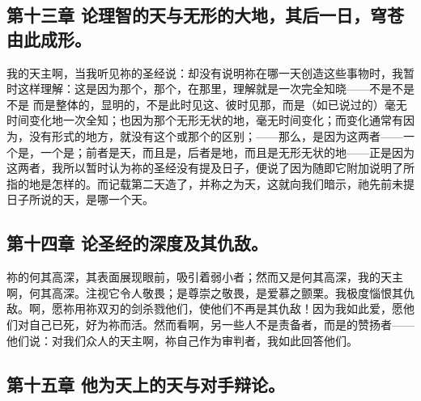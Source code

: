 \subsection{第十三章 论理智的天与无形的大地，其后一日，穹苍由此成形。}

我的天主啊，当我听见祢的圣经说：却没有说明祢在哪一天创造这些事物时，我暂时这样理解：这是因为那个，那个，在那里，理解就是一次完全知晓——不是不是不是 而是整体的，显明的，不是此时见这、彼时见那，而是（如已说过的）毫无时间变化地一次全知；也因为那个无形无状的地，毫无时间变化；而变化通常有因为，没有形式的地方，就没有这个或那个的区别；——那么，是因为这两者——一个是，一个是；前者是天，而且是，后者是地，而且是无形无状的地——正是因为这两者，我所以暂时认为祢的圣经没有提及日子，便说了因为随即它附加说明了所指的地是怎样的。而记载第二天造了，并称之为天，这就向我们暗示，祂先前未提日子所说的天，是哪一个天。\par


\subsection{第十四章 论圣经的深度及其仇敌。}

祢的何其高深，其表面展现眼前，吸引着弱小者；然而又是何其高深，我的天主啊，何其高深。注视它令人敬畏；是尊崇之敬畏，是爱慕之颤栗。我极度惱恨其仇敌。啊，愿祢用祢双刃的剑杀戮他们，使他们不再是其仇敌！因为我如此爱，愿他们对自己已死，好为祢而活。然而看啊，另一些人不是责备者，而是的赞扬者——他们说：对我们众人的天主啊，祢自己作为审判者，我如此回答他们。\par


\subsection{第十五章 他为天上的天与对手辩论。}

